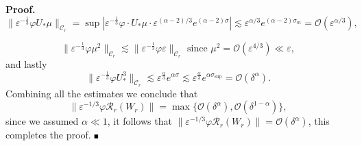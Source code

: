 \documentclass[letterpaper,11pt]{article}
\newcommand{\Ral}{\mathcal{R}}
\newcommand{\rmO}{\mathcal{O}}
\newcommand{\eps}{\varepsilon}
\newcommand{\lar}{ \lesssim }
\numberwithin{equation}{section}
\theoremstyle{plain}
\newenvironment{Proof}[1][.]%
 {\begin{trivlist}\item[]\textbf{Proof#1 }}%
 {\hspace*{\fill}$\rule{0.3\baselineskip}{0.35\baselineskip}$\end{trivlist}}
\begin{document}
\begin{Proof}
\[
\|\eps^{-\frac{1}{3}}\varphi U_*\mu \|_{\mathcal{C}_r} =\sup |\eps^{-\frac{1}{3}} \varphi \cdot U_*\mu \cdot \eps^{(\alpha-2)/3}e^{(\alpha-2)\sigma} | \lar \eps^{\alpha/3} e^{(\alpha-2)\sigma_m}  =\rmO( \eps^{\alpha/3}) ,
\]

\[
\|\eps^{-\frac{1}{3}}\varphi \mu^2 \|_{\mathcal{C}_r} \lar \|\eps^{-\frac{1}{3}}\varphi \eps \|_{\mathcal{C}_r} \text{ since } \mu^2 = \rmO(\eps^{4/3}) \ll \eps, 
\]
and lastly
\[
\|\eps^{-\frac{1}{3}}\varphi U_*^3\|_{\mathcal{C}_r} \lar \eps^{\frac{\alpha}{3}} e^{\alpha\sigma} \lar \eps^{\frac{\alpha}{3}} e^{\alpha\sigma_{\sup}} = \rmO(\delta^\alpha).
\]
Combining all the estimates we conclude that 
\[
\|\eps^{-1/3}\varphi \Ral_r(W_r) \| = \max\{ \rmO(\delta^\alpha), \rmO(\delta^{1-\alpha})\},
\]
since we assumed $\alpha \ll 1$, it follows that $\|\eps^{-1/3}\varphi \Ral_r(W_r) \| = \rmO(\delta^\alpha)$, this completes the proof.
\end{Proof}
\end{document}
